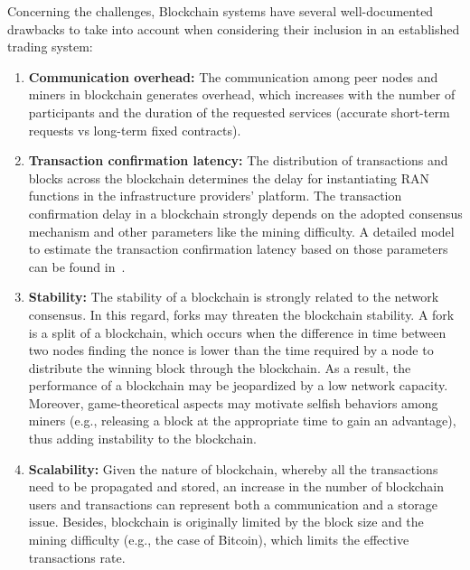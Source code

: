 \documentclass[journal]{IEEEtran}
\begin{document}
	Concerning the challenges, Blockchain systems have several well-documented drawbacks to take into account when considering their inclusion in an established trading system: 
	\begin{enumerate}
		\item \textbf{Communication overhead:} The communication among peer nodes and miners in blockchain generates overhead, which increases with the number of participants and the duration of the requested services (accurate short-term requests vs long-term fixed contracts).
		\item \textbf{Transaction confirmation latency:} The distribution of transactions and blocks across the blockchain determines the delay for instantiating RAN functions in the infrastructure providers' platform. The transaction confirmation delay in a blockchain strongly depends on the adopted consensus mechanism and other parameters like the mining difficulty. A detailed model to estimate the transaction confirmation latency based on those parameters can be found in~\cite{FWilhelmi_PIMRC}.
		\item \textbf{Stability:} The stability of a blockchain is strongly related to the network consensus. In this regard, forks may threaten the blockchain stability. A fork is a split of a blockchain, which occurs when the difference in time between two nodes finding the nonce is lower than the time required by a node to distribute the winning block through the blockchain. As a result, the performance of a blockchain may be jeopardized by a low network capacity. Moreover, game-theoretical aspects may motivate selfish behaviors among miners (e.g., releasing a block at the appropriate time to gain an advantage), thus adding instability to the blockchain.
		\item \textbf{Scalability:} Given the nature of blockchain, whereby all the transactions need to be propagated and stored, an increase in the number of blockchain users and transactions can represent both a communication and a storage issue. Besides, blockchain is originally limited by the block size and the mining difficulty (e.g., the case of Bitcoin), which limits the effective transactions rate. 
	\end{enumerate}
	
\end{document}
